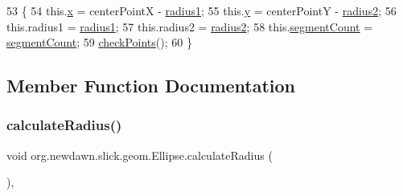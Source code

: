\begin{DoxyCode}
53                                                                                                            
      \{
54         this.\mbox{\hyperlink{classorg_1_1newdawn_1_1slick_1_1geom_1_1_shape_a3e985bfff386c15a4efaad03d8ad60d3}{x}} = centerPointX - \mbox{\hyperlink{classorg_1_1newdawn_1_1slick_1_1geom_1_1_ellipse_a26f6d13c3b22a475bc1caf33f84a24b9}{radius1}};
55         this.\mbox{\hyperlink{classorg_1_1newdawn_1_1slick_1_1geom_1_1_shape_a9f934baded6a1b65ebb69e7e5f80ea00}{y}} = centerPointY - \mbox{\hyperlink{classorg_1_1newdawn_1_1slick_1_1geom_1_1_ellipse_ad3152cb17acd020ac3ae7bf70526ae9f}{radius2}};
56         this.radius1 = \mbox{\hyperlink{classorg_1_1newdawn_1_1slick_1_1geom_1_1_ellipse_a26f6d13c3b22a475bc1caf33f84a24b9}{radius1}};
57         this.radius2 = \mbox{\hyperlink{classorg_1_1newdawn_1_1slick_1_1geom_1_1_ellipse_ad3152cb17acd020ac3ae7bf70526ae9f}{radius2}};
58         this.\mbox{\hyperlink{classorg_1_1newdawn_1_1slick_1_1geom_1_1_ellipse_a08f529daee51987987eda5f422abdd31}{segmentCount}} = \mbox{\hyperlink{classorg_1_1newdawn_1_1slick_1_1geom_1_1_ellipse_a08f529daee51987987eda5f422abdd31}{segmentCount}};
59         \mbox{\hyperlink{classorg_1_1newdawn_1_1slick_1_1geom_1_1_shape_a84293802d05e8666a441720bfc12745d}{checkPoints}}();
60     \}
\end{DoxyCode}


\subsection{Member Function Documentation}
\mbox{\label{classorg_1_1newdawn_1_1slick_1_1geom_1_1_ellipse_afef98fdf029020ec2289de898db6ec16}} 
\subsubsection{\texorpdfstring{calculate\+Radius()}{calculateRadius()}}
{\footnotesize\ttfamily void org.\+newdawn.\+slick.\+geom.\+Ellipse.\+calculate\+Radius (\begin{DoxyParamCaption}{ }\end{DoxyParamCaption})\hspace{0.3cm}{\ttfamily [inline]}, {\ttfamily [protected]}}

